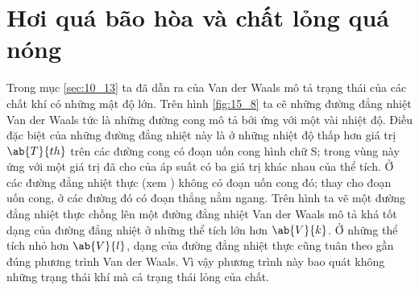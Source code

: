 \section{Hơi quá bão hòa và chất lỏng quá nóng}\label{sec:15_5}

Trong mục \ref{sec:10_13} ta đã dẫn ra  của Van der Waals mô tả trạng thái của các chất khí có những mật độ lớn. Trên hình \ref{fig:15_8} ta cẽ những đường đẳng nhiệt Van der Waals tức là những đường cong mô tả bởi  ứng với một vài nhiệt độ. Điều đặc biệt của những đường đẳng nhiệt này là ở những nhiệt độ thấp hơn giá trị $\ab{T}{th}$ trên các đường cong có đoạn uốn cong hình chữ S; trong vùng này ứng với một giá trị đã cho của áp suất có ba giá trị khác nhau của thể tích. Ở các đường đẳng nhiệt thực (xem ) không có đoạn uốn cong đó; thay cho đoạn uốn cong, ở các đường đó có đoạn thẳng nằm ngang. Trên hình  ta vẽ một đường đẳng nhiệt thực chồng lên một đường đẳng nhiệt Van der Waals mô tả khá tốt dạng của đường đẳng nhiệt ở những thể tích lớn hơn $\ab{V}{k}$. Ở những thể tích nhỏ hơn $\ab{V}{l}$, dạng của đường đẳng nhiệt thực cũng tuân theo gần đúng phương trình Van der Waals. Vì vậy phương trình này bao quát không những trạng thái khí mà cả trạng thái lỏng của chất.\\

